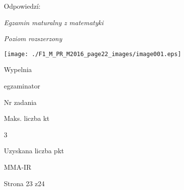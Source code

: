 \documentclass[a4paper,12pt]{article}
\begin{document}
Odpowiedzí:

{\it Egzamin maturalny z matematyki}

{\it Poziom rozszerzony}
\begin{center}
\texttt{[image: ./F1\_M\_PR\_M2016\_page22\_images/image001.eps]}
\end{center}
Wypelnia

egzaminator

Nr zadania

Maks. liczba kt

3

Uzyskana liczba pkt

MMA-IR

Strona 23 z24
\end{document}
